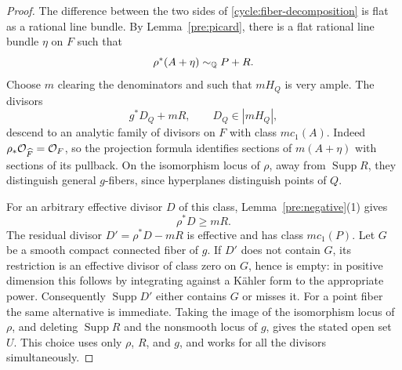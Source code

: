 \begin{proof}
The difference between the two sides of
\eqref{cycle:fiber-decomposition} is flat as a rational line bundle.
By Lemma~\ref{pre:picard}, there is a flat rational line
bundle $\eta$ on $F$ such that
\[
                         \rho^*(A+\eta)\sim_{\mathbb Q} P+R.
\]
Choose $m$ clearing the denominators and such that $mH_Q$ is very ample.
The divisors
\[
                   g^*D_Q+mR,
                   \qquad D_Q\in|mH_Q|,
\]
descend to an analytic family of divisors on $F$ with class $m c_1(A)$.
Indeed $\rho_*\mathcal O_{\widehat F}=\mathcal O_F$, so the projection formula
identifies sections of $m(A+\eta)$ with sections of its pullback.
On the isomorphism locus of $\rho$, away from $\operatorname{Supp}R$,
they distinguish general $g$-fibers, since hyperplanes distinguish
points of $Q$.

For an arbitrary effective divisor $D$ of this class,
Lemma~\ref{pre:negative}(1) gives
\[
                         \rho^*D\geq mR.
\]
The residual divisor $D'=\rho^*D-mR$ is effective and has class
$m c_1(P)$.  Let $G$ be a smooth compact connected fiber of $g$.  If
$D'$ does not contain $G$, its restriction is an effective divisor of
class zero on $G$, hence is empty: in positive dimension this follows
by integrating against a K\"ahler form to the appropriate power.
Consequently $\operatorname{Supp}D'$ either contains $G$ or misses it.
For a point fiber the same alternative is immediate.  Taking the image
of the isomorphism locus of $\rho$, and deleting
$\operatorname{Supp}R$ and the nonsmooth locus of $g$, gives the stated
open set $U$.  This choice uses only $\rho$, $R$, and $g$, and works for
all the divisors simultaneously.
\end{proof}

